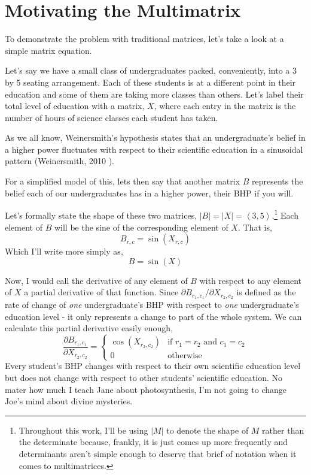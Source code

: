 \documentclass[12pt]{book}
\theoremstyle{plain}
\theoremstyle{definition}
\theoremstyle{ppart}
\theoremstyle{case}
\theoremstyle{solution}
\newcommand{\shape}[1]{\left|#1\right|}
\begin{document}
\section{Motivating the Multimatrix}

To demonstrate the problem with traditional matrices, let's take a look at a
simple matrix equation. 

Let's say we have a small class of undergraduates packed, conveniently, into a 3 by 5
seating arrangement. Each of these students is at a different point in their education
and some of them are taking more classes than others.
Let's label their total level of education with a matrix, $X$, where each entry
in the matrix is the number of hours of science classes each student has taken.

As we all know, Weinersmith's hypothesis states that an undergraduate's belief in a
higher power fluctuates with respect to their scientific education in a sinusoidal
pattern (Weinersmith, 2010 \cite{weinersmith:education}).

For a simplified model of this, lets then say that another matrix $B$ represents the
belief each of our undergraduates has in a higher power, their BHP if you will.

Let's formally state the shape of these two matrices,
$\shape{B} = \shape{X} = \left< 3,5 \right>$.\footnote{Throughout this work, I'll be using
$\shape{M}$ to denote the shape of $M$ rather than the determinate because, frankly, it
is just comes up more frequently and determinants aren't simple enough to deserve that
brief of notation when it comes to multimatrices.}
Each element of $B$ will be the sine of the corresponding element of
$X$. That is, \[B_{r,c} = \sin(X_{r,c})\]
Which I'll write more simply as, \[B = \sin(X)\]

Now, I would call the derivative of any element of $B$ with respect to any element
of $X$ a partial derivative of that function. Since
$\partial B_{r_1, c_1}/\partial X_{r_2, c_2}$ is defined as the rate of change of
\textit{one} undergraduate's BHP with respect to \textit{one}
undergraduate's education level - it only represents a change to part of the whole
system. 
We can calculate this partial derivative easily enough,
\[
\frac{\partial B_{r_1,c_1}}{\partial X_{r_2,c_2}} = 
\left\{
  \begin{array}{ll}
    \cos(X_{r_2,c_2})  & \mbox{if } r_1 = r_2 \mbox{ and } c_1 = c_2 \\
    0 & \mbox{otherwise}
  \end{array}
\right.
\]
Every student's BHP changes with respect to their own
scientific education level but does not change with respect to other students'
scientific education. No mater how much I teach Jane about photosynthesis, I'm
not going to change Joe's mind about divine mysteries.
\end{document}
